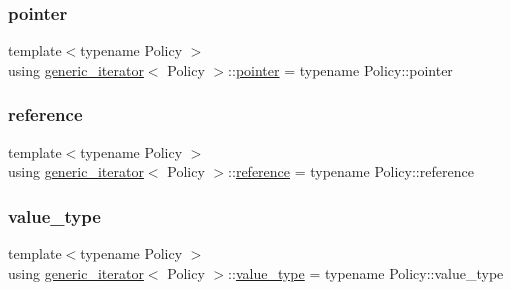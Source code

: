 \mbox{\label{classgeneric__iterator_ab1e9fe365dec39e05180fb7e1c153f2e}} 
\subsubsection{\texorpdfstring{pointer}{pointer}}
{\footnotesize\ttfamily template$<$typename Policy $>$ \\
using \mbox{\hyperlink{classgeneric__iterator}{generic\+\_\+iterator}}$<$ Policy $>$\+::\mbox{\hyperlink{classgeneric__iterator_ab1e9fe365dec39e05180fb7e1c153f2e}{pointer}} =  typename Policy\+::pointer}

\mbox{\label{classgeneric__iterator_aed22b28672b10453f89e239e55277808}} 
\subsubsection{\texorpdfstring{reference}{reference}}
{\footnotesize\ttfamily template$<$typename Policy $>$ \\
using \mbox{\hyperlink{classgeneric__iterator}{generic\+\_\+iterator}}$<$ Policy $>$\+::\mbox{\hyperlink{classgeneric__iterator_aed22b28672b10453f89e239e55277808}{reference}} =  typename Policy\+::reference}

\mbox{\label{classgeneric__iterator_ae0024f1a05a39cbf0a2bc6f07b4357e0}} 
\subsubsection{\texorpdfstring{value\_type}{value\_type}}
{\footnotesize\ttfamily template$<$typename Policy $>$ \\
using \mbox{\hyperlink{classgeneric__iterator}{generic\+\_\+iterator}}$<$ Policy $>$\+::\mbox{\hyperlink{classgeneric__iterator_ae0024f1a05a39cbf0a2bc6f07b4357e0}{value\+\_\+type}} =  typename Policy\+::value\+\_\+type}



